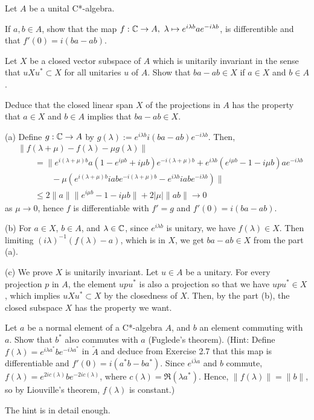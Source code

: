 \documentclass{../../small}
\begin{document}
\begin{prb}
Let $A$ be a unital C*-algebra.
\begin{parts}
\item
If $a,b\in A$, show that the map $f:\mathbb{C}\to A,\ \lambda\mapsto e^{i\lambda b}ae^{-i\lambda b}$, is differentible and that $f'(0)=i(ba-ab)$.
\item
Let $X$ be a closed vector subspace of $A$ which is unitarily invariant in the sense that $uXu^*\subset X$ for all unitaries $u$ of $A$.
Show that $ba-ab\in X$ if $a\in X$ and $b\in A$.
\item
Deduce that the closed linear span $X$ of the projections in $A$ has the property that $a\in X$ and $b\in A$ implies that $ba-ab\in X$.
\end{parts}
\end{prb}
\begin{sol}
(a)
Define $g:\mathbb{C}\to A$ by $g(\lambda):=e^{i\lambda b}i(ba-ab)e^{-i\lambda b}$.
Then,
\begin{align*}
&\|f(\lambda+\mu)-f(\lambda)-\mu g(\lambda)\|\\
&\qquad=\|e^{i(\lambda+\mu)b}a(1-e^{i\mu b}+i\mu b)e^{-i(\lambda+\mu)b}
+e^{i\lambda b}(e^{i\mu b}-1-i\mu b)ae^{-i\lambda b}\\
&\qquad\qquad-\mu(e^{i(\lambda+\mu)b}iabe^{-i(\lambda+\mu)b}-e^{i\lambda b}iabe^{-i\lambda b})\|\\
&\qquad\le2\|a\|\|e^{i\mu b}-1-i\mu b\|+2|\mu|\|ab\|\to0
\end{align*}
as $\mu\to0$, hence $f$ is differentiable with $f'=g$ and $f'(0)=i(ba-ab)$.

(b)
For $a\in X$, $b\in A$, and $\lambda\in\mathbb{C}$, since $e^{i\lambda b}$ is unitary, we have $f(\lambda)\in X$.
Then limiting $(i\lambda)^{-1}(f(\lambda)-a)$, which is in $X$, we get $ba-ab\in X$ from the part (a).

(c)
We prove $X$ is unitarily invariant.
Let $u\in A$ be a unitary.
For every projection $p$ in $A$, the element $upu^*$ is also a projection so that we have $upu^*\in X$, which implies $uXu^*\subset X$ by the closedness of $X$.
Then, by the part (b), the closed subspace $X$ has the property we want.
\end{sol}


\begin{prb}
Let $a$ be a normal element of a C*-algebra $A$, and $b$ an element commuting with $a$. Show that $b^*$ also commutes with $a$ (Fuglede's theorem).
(Hint: Define $f(\lambda)=e^{i\lambda a^*}be^{- i\lambda a^*}$ in $\tilde A$ and deduce from Exercise 2.7 that this map is differentiable and $f'(0)=i(a^*b-ba^*)$.
Since $e^{i\bar\lambda a}$ and $b$ commute, $f(\lambda)=e^{2ic(\lambda)}be^{-2ic(\lambda)}$, where $c(\lambda)=\Re(\lambda a^*)$.
Hence, $\|f(\lambda)\|=\|b\|$, so by Liouville's theorem, $f(\lambda)$ is constant.)
\end{prb}
\begin{sol}
The hint is in detail enough.
\end{sol}
\end{document}
